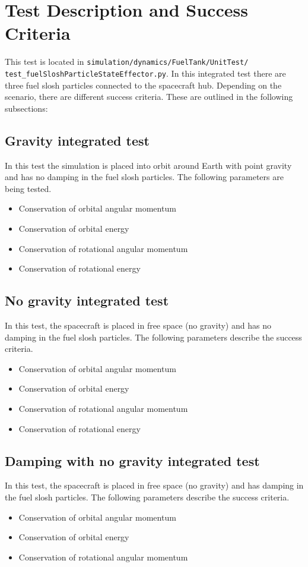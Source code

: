 \section{Test Description and Success Criteria}
This test is located in \texttt{simulation/dynamics/FuelTank/UnitTest/\newline
test\_fuelSloshParticleStateEffector.py}. In this integrated test there are three fuel slosh particles connected to the spacecraft hub.  Depending on the scenario, there are different success criteria. These are outlined in the following subsections:
\subsection{Gravity integrated test}
In this test the simulation is placed into orbit around Earth with point gravity and has no damping in the fuel slosh particles. The following parameters are being tested. 
\begin{itemize}
	\item Conservation of orbital angular momentum
	\item Conservation of orbital energy
	\item Conservation of rotational angular momentum
	\item Conservation of rotational energy
\end{itemize}

\subsection{No gravity integrated test}
In this test, the spacecraft is placed in free space (no gravity) and has no damping in the fuel slosh particles. The following parameters describe the success criteria.
\begin{itemize}
\item Conservation of orbital angular momentum
\item Conservation of orbital energy
\item Conservation of rotational angular momentum
\item Conservation of rotational energy
\end{itemize}

\subsection{Damping with no gravity integrated test}
In this test, the spacecraft is placed in free space (no gravity) and has damping in the fuel slosh particles. The following parameters describe the success criteria.
\begin{itemize}
	\item Conservation of orbital angular momentum
	\item Conservation of orbital energy
	\item Conservation of rotational angular momentum
\end{itemize}


